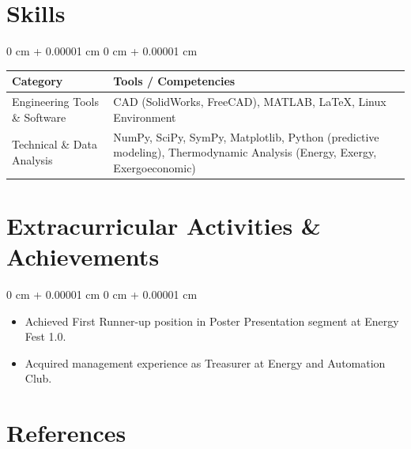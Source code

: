 \documentclass[10pt, letterpaper]{article}
\newenvironment{highlightsforbulletentries}{
  \begin{itemize}[
        topsep=2pt,
        parsep=0pt,
        partopsep=0pt,
        itemsep=0pt,
        leftmargin=10pt
      ]
    }{
  \end{itemize}
} %
\newenvironment{onecolentry}{
  \begin{adjustwidth}{
      0 cm + 0.00001 cm
    }{
      0 cm + 0.00001 cm
    }
  }{
  \end{adjustwidth}
} %
\begin{document}

\section{Skills}

\begin{onecolentry}
  \begin{tabularx}{\textwidth}{@{} l X @{}}
    \textbf{Category} & \textbf{Tools / Competencies} \\
    \midrule
    Engineering Tools \& Software & CAD (SolidWorks, FreeCAD),
    MATLAB, \LaTeX, Linux Environment \\
    Technical \& Data Analysis & NumPy, SciPy, SymPy, Matplotlib,
    Python (predictive modeling), Thermodynamic Analysis (Energy,
    Exergy, Exergoeconomic) \\
    \midrule
  \end{tabularx}
\end{onecolentry}


\section{Extracurricular Activities \& Achievements}

\begin{onecolentry}
  \begin{highlightsforbulletentries}
  \item Achieved First Runner-up position in Poster Presentation
    segment at Energy Fest 1.0.
  \item Acquired management experience as Treasurer at Energy and
    Automation Club.
  \end{highlightsforbulletentries}
\end{onecolentry}


\section{References}
\end{document}
